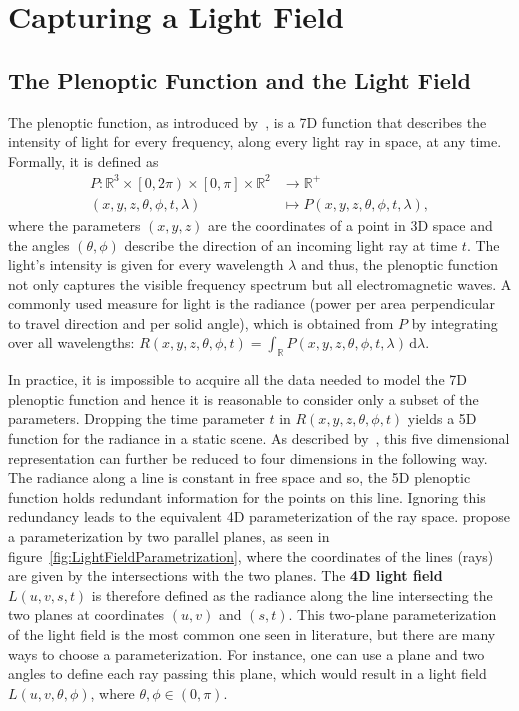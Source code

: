 \chapter{Capturing a Light Field}
\label{chp:light_field_capturing}


\section{The Plenoptic Function and the Light Field}

The plenoptic function, as introduced by~\cite{AdelsonBergen}, is a 7D function that describes the intensity of light for every frequency, along every light ray in space, at any time. 
Formally, it is defined as
\begin{align*}
	P \colon \mathbb{R}^3 \times \left[0, 2 \pi \right) \times \left[ 0, \pi \right] \times \mathbb{R}^2 & \to \mathbb{R}^+ \\
	\left(x, y, z, \theta, \phi, t, \lambda \right) & \mapsto P\left(x, y, z, \theta, \phi, t, \lambda \right), 
\end{align*}
where the parameters $\left(x, y, z\right)$ are the coordinates of a point in 3D space and the angles $\left(\theta, \phi \right)$ describe the direction of an incoming light ray at time $t$. 
The light's intensity is given for every wavelength $\lambda$ and thus, the plenoptic function not only captures the visible frequency spectrum but all electromagnetic waves. 
A commonly used measure for light is the radiance (power per area perpendicular to travel direction and per solid angle), which is obtained from $P$ by integrating over all wavelengths: 
$R\left(x, y, z, \theta, \phi, t\right) = \int_{\mathbb{R}} \! P\left(x, y, z, \theta, \phi, t, \lambda \right) \, \mathrm{d} \lambda$.

In practice, it is impossible to acquire all the data needed to model the 7D plenoptic function and hence it is reasonable to consider only a subset of the parameters. 
Dropping the time parameter $t$ in $R\left( x, y, z, \theta, \phi, t \right) $ yields a 5D function for the radiance in a static scene. 
As described by~\cite{LightFieldRendering}, this five dimensional representation can further be reduced to four dimensions in the following way. 
The radiance along a line is constant in free space and so, the 5D plenoptic function holds redundant information for the points on this line. 
Ignoring this redundancy leads to the equivalent 4D parameterization of the ray space. 
\cite{LightFieldRendering} propose a parameterization by two parallel planes, as seen in figure~\ref{fig:LightFieldParametrization}, where the coordinates of the lines (rays) are given by the intersections with the two planes.
The \textbf{4D light field} $L(u, v, s, t)$ is therefore defined as the radiance along the line intersecting the two planes at coordinates $(u, v)$ and $(s, t)$.
This two-plane parameterization of the light field is the most common one seen in literature, but there are many ways to choose a parameterization.
For instance, one can use a plane and two angles to define each ray passing this plane, which would result in a light field $L(u, v, \theta, \phi)$, where $\theta, \phi \in (0, \pi)$.

